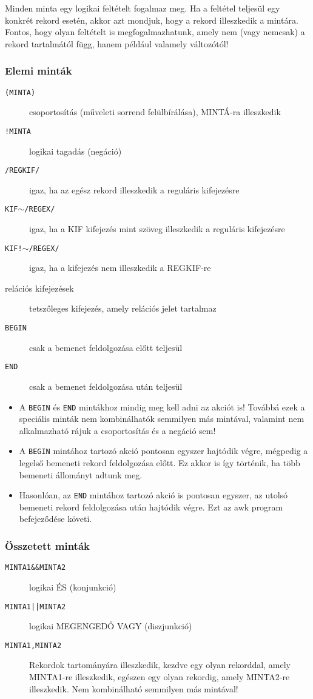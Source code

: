 Minden minta egy logikai feltételt fogalmaz meg. Ha a feltétel teljesül egy
konkrét rekord esetén, akkor azt mondjuk, hogy a rekord illeszkedik a
mintára. Fontos, hogy olyan feltételt is megfogalmazhatunk, amely nem
(vagy nemcsak) a rekord tartalmától függ, hanem például valamely változótól!

\subsubsection*{Elemi minták}
\begin{description}
\item[\texttt{(MINTA)}] csoportosítás (műveleti sorrend felülbírálása), MINTÁ-ra
illeszkedik
\item[\texttt{!MINTA}] logikai tagadás (negáció)
\item[\texttt{/REGKIF/}] igaz, ha az egész rekord illeszkedik a reguláris kifejezésre
\item[\texttt{KIF$\sim$/REGEX/}] igaz, ha a KIF kifejezés  mint szöveg
illeszkedik a reguláris kifejezésre
\item[\texttt{KIF!$\sim$/REGEX/}] igaz, ha a kifejezés nem illeszkedik a REGKIF-re
\item[relációs kifejezések] tetszőleges kifejezés, amely relációs jelet tartalmaz
\item[\texttt{BEGIN}] csak a bemenet feldolgozása előtt teljesül\label{begin}
\item[\texttt{END}] csak a bemenet feldolgozása után teljesül
\end{description}

\begin{itemize}
\item A \texttt{BEGIN}  és \texttt{END}  mintákhoz mindig meg kell adni az akciót is! Továbbá
ezek a speciális minták nem kombinálhatók semmilyen más mintával,
valamint nem alkalmazható rájuk a csoportosítás és a negáció sem!
\item A \texttt{BEGIN}  mintához tartozó akció pontosan egyszer hajtódik végre,
mégpedig a legelső bemeneti rekord feldolgozása előtt. Ez akkor is így
történik, ha több bemeneti állományt adtunk meg.
\item Hasonlóan, az \texttt{END}  mintához tartozó akció is pontosan egyszer, az utolsó
bemeneti rekord feldolgozása után hajtódik végre. Ezt az awk program
befejeződése követi.
\end{itemize}


\subsubsection*{Összetett minták}
\begin{description}
\item[\texttt{MINTA1\&\&MINTA2}] logikai ÉS (konjunkció)
\item[\texttt{MINTA1||MINTA2}] logikai MEGENGEDŐ VAGY (diszjunkció)
\item[\texttt{MINTA1,MINTA2}] Rekordok tartományára illeszkedik, kezdve egy olyan
rekorddal, amely MINTA1-re illeszkedik, egészen egy olyan rekordig,
amely MINTA2-re illeszkedik. Nem kombinálható semmilyen más
mintával!
\end{description}



